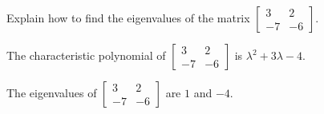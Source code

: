 
\begin{exerciseStatement}


Explain how to find the eigenvalues of the matrix \( \left[\begin{array}{cc}
3 & 2 \\
-7 & -6
\end{array}\right] \).


\end{exerciseStatement}
    
\begin{exerciseAnswer} 


The characteristic polynomial of \( \left[\begin{array}{cc}
3 & 2 \\
-7 & -6
\end{array}\right] \) is \( \lambda^{2} + 3 \lambda - 4 \).



The eigenvalues of \( \left[\begin{array}{cc}
3 & 2 \\
-7 & -6
\end{array}\right] \) are \( 1 \) and \( -4 \).


\end{exerciseAnswer}
    
